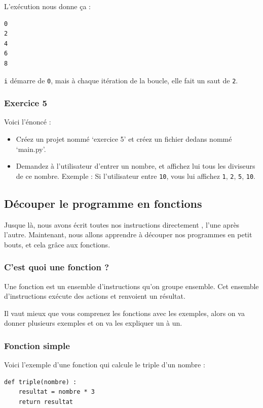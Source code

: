 \documentclass[12pt]{article}
\newcommand{\code}[1]{\colorbox{light-gray}{\texttt{#1}}}
\begin{document}
            L'exécution nous donne ça :
            \begin{lstlisting}[style=exec_result]
0
2
4
6
8
            \end{lstlisting}

            \code{i} démarre de \code{0}, mais à chaque itération de la boucle, elle fait un saut de \code{2}.

        \subsubsection{Exercice 5}
            Voici l'énoncé :
            \begin{itemize}
                \item Créez un projet nommé `exercice 5' et créez un fichier dedans nommé `main.py'.
                \item Demandez à l'utilisateur d'entrer un nombre, et affichez lui tous les diviseurs de ce nombre. 
                    Exemple : Si l'utilisateur entre \code{10}, vous lui affichez \code{1}, \code{2}, \code{5}, \code{10}.
            \end{itemize}

\clearpage

    \subsection{Découper le programme en fonctions}
        Jusque là, nous avons écrit toutes nos instructions directement , l'une après l'autre. Maintenant, nous allons
        apprendre à découper nos programmes en petit bouts, et cela grâce aux fonctions.

        \subsubsection{C'est quoi une fonction ?}
            Une fonction est un ensemble d'instructions qu'on groupe ensemble. Cet ensemble d'instructions exécute 
            des actions et renvoient un résultat.

            Il vaut mieux que vous comprenez les fonctions avec les exemples, alors on va donner plusieurs exemples
            et on va les expliquer un à un.

        \subsubsection{Fonction simple}

            Voici l'exemple d'une fonction qui calcule le triple d'un nombre :
            \begin{lstlisting}[style=code]
def triple(nombre) :
    resultat = nombre * 3
    return resultat
            \end{lstlisting}
\end{document}
